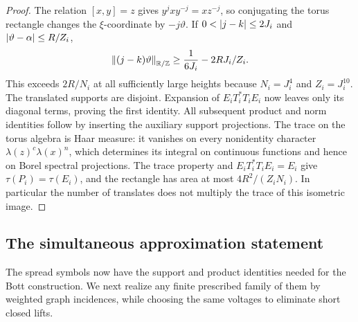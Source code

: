 \begin{proof}
The relation \([x,y]=z\) gives \(y^jxy^{-j}=xz^{-j}\), so conjugating the
torus rectangle changes the \(\xi\)-coordinate by \(-j\vartheta\).  If
\(0<\left\lvert j-k\right\rvert\leq2J_i\) and \(\left\lvert\vartheta-\alpha\right\rvert\leq R/Z_i\),
\[
 \left\lVert(j-k)\vartheta\right\rVert_{\mathbb R/\mathbb Z}
 \geq\frac{1}{6J_i}-2RJ_i/Z_i.
\]
This exceeds \(2R/N_i\) at all sufficiently large heights because
\(N_i=J_i^4\) and \(Z_i=J_i^{10}\).  The translated supports are disjoint.
Expansion of \(E_iT_i^*T_iE_i\) now leaves only its diagonal terms, proving
the first identity.  All subsequent product and norm identities follow by
inserting the auxiliary support projections.  The trace on the torus algebra
is Haar measure: it vanishes on every nonidentity character
\(\lambda(z)^c\lambda(x)^n\), which determines its integral on continuous
functions and hence on Borel spectral projections.  The trace property and
\(E_iT_i^*T_iE_i=E_i\) give \(\tau(P_i)=\tau(E_i)\), and the rectangle has
area at most \(4R^2/(Z_iN_i)\).  In particular the number of translates does
not multiply the trace of this isometric image.
\end{proof}

\subsection{The simultaneous approximation statement}

The spread symbols now have the support and product identities needed for the
Bott construction.  We next realize any finite prescribed family of them by
weighted graph incidences, while choosing the same voltages to eliminate
short closed lifts.


